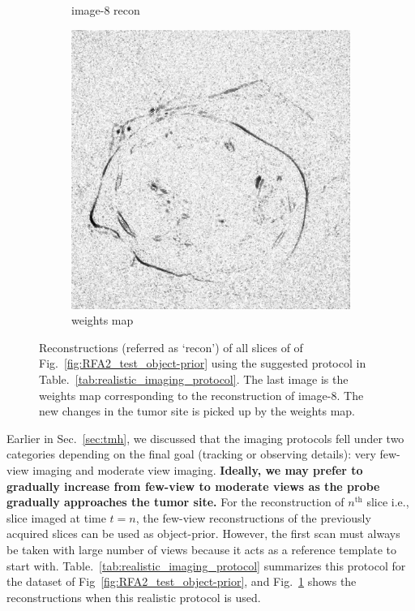 \documentclass[journal]{IEEEtran}
\begin{document}
\begin{figure}[!h]
\begin{subfigure}[b]{0.24\linewidth}
\captionsetup{labelformat=empty}       
 \caption{image-8 recon}
    \end{subfigure}
       \begin{subfigure}[b]{0.24\linewidth}
        \includegraphics[width=\textwidth]{../images/tmh/RFA2/new_protocol/weightsIm_all_methods_kk_0_01.png}
\captionsetup{labelformat=empty}       
 \caption{weights map}
    \end{subfigure}
       \caption{Reconstructions (referred as `recon') of all slices of  of Fig.~\ref{fig:RFA2_test_object-prior} using the suggested protocol in Table.~\ref{tab:realistic_imaging_protocol}. The last image is the weights map corresponding to the reconstruction of image-8. The new changes in the tumor site is picked up by the weights map. }
\label{fig:RFA2_new_protocol}
\end{figure}

Earlier in Sec.~\ref{sec:tmh}, we discussed that the imaging protocols fell under two categories depending on the final goal (tracking or observing details): very few-view imaging and moderate view imaging. \textbf{Ideally, we may prefer to gradually increase from few-view to moderate views as the probe gradually approaches the tumor site.} For the reconstruction of $n^{\textrm{th}}$ slice i.e., slice imaged at time $t=n$, the few-view reconstructions of the previously acquired slices can be used as object-prior. However, the first scan must always be taken with large number of views because it acts as a reference template to start with. Table.~\ref{tab:realistic_imaging_protocol} summarizes this protocol for the dataset of Fig~\ref{fig:RFA2_test_object-prior}, and Fig.~\ref{fig:RFA2_new_protocol} shows the reconstructions when this realistic protocol is used.
\end{document}
